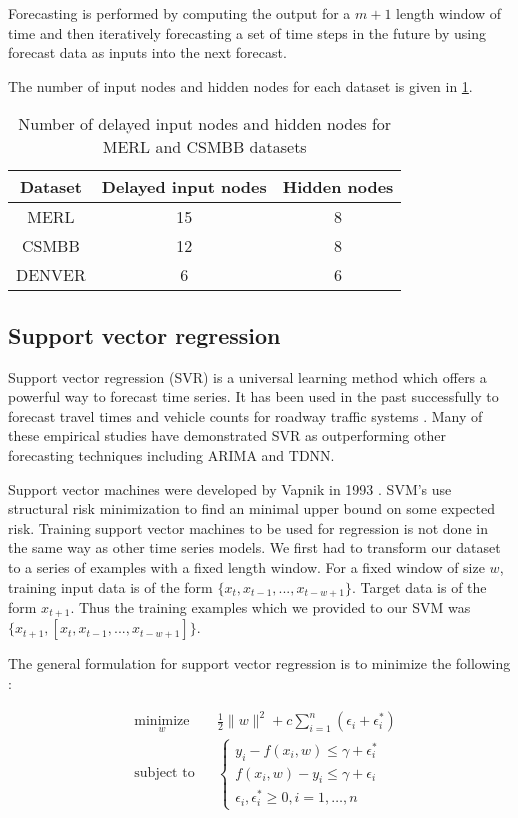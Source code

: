 Forecasting is performed by computing the output for a $m + 1$ length window of time and then iteratively forecasting a set of time steps in the future by using forecast data as inputs into the next forecast. 

The number of input nodes and hidden nodes for each dataset is given in \ref{fig:tdnntab}.

\begin{table}[h]
\centering
\caption{Number of delayed input nodes and hidden nodes for MERL and CSMBB datasets}
\begin{tabular}{|c|c|c|} \hline
Dataset & Delayed input nodes & Hidden nodes\\ \hline
MERL & 15 & 8\\ \hline
CSMBB & 12 & 8\\ \hline
DENVER & 6 & 6\\ \hline
\end{tabular}
\label{fig:tdnntab}
\end{table}


\subsection{Support vector regression}
Support vector regression (SVR) is a universal learning method which offers a powerful way to forecast time series.  It has been used in the past successfully to forecast travel times and vehicle counts for roadway traffic systems \cite{Wu2004, Wei2013, Wei2012, Howard2013}.  Many of these empirical studies have demonstrated SVR as outperforming other forecasting techniques including ARIMA and TDNN.

Support vector machines were developed by Vapnik in 1993 \cite{Vapnik1998}.  SVM's use structural risk minimization to find an minimal upper bound on some expected risk.  Training support vector machines to be used for regression is not done in the same way as other time series models.  We first had to transform our dataset to a series of examples with a fixed length window.  For a fixed window of size $w$, training input data is of the form $\{x_{t}, x_{t - 1}, ..., x_{t - w + 1}\}$.  Target data is of the form $x_{t + 1}$.  Thus the training examples which we provided to our SVM was $\{x_{t + 1}, [x_{t}, x_{t - 1}, ..., x_{t - w + 1}]\}$.

The general formulation for support vector regression is to minimize the following \cite{Smola1998}:

\begin{equation*}
\begin{aligned}
	& \underset{w}{\text{minimize}}
		& & \frac{1}{2}\|w\|^{2} + c \sum_{i = 1}^{n}(\epsilon_{i} + \epsilon^{*}_{i}) \\
	& \text{subject to}
		& & \begin{cases}
			y_{i} - f(x_{i}, w) \le \gamma + \epsilon^{*}_{i} \\
			f(x_{i}, w) - y_{i} \le \gamma + \epsilon_{i} \\
			\epsilon_{i}, \epsilon_{i}^{*} \ge 0, i = 1, \ldots, n
			\end{cases}
\end{aligned}
\end{equation*}

